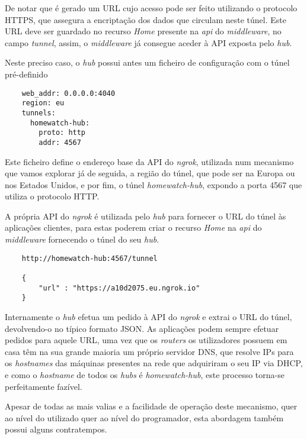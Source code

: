 De notar que é gerado um URL cujo acesso pode ser feito utilizando o protocolo HTTPS, que assegura a encriptação dos dados que circulam neste túnel. Este URL deve ser guardado no recurso \textit{Home} presente na \textit{api} do \textit{middleware}, no campo \textit{tunnel}, assim, o \textit{middleware} já consegue aceder à API exposta pelo \textit{hub}.

Neste preciso caso, o \textit{hub} possui antes um ficheiro de configuração com o túnel pré-definido

\begin{verbatim}
    web_addr: 0.0.0.0:4040
    region: eu
    tunnels:
      homewatch-hub:
        proto: http
        addr: 4567
\end{verbatim}

Este ficheiro define o endereço base da API do \textit{ngrok}, utilizada num mecanismo que vamos explorar já de seguida, a região do túnel, que pode ser na Europa ou nos Estados Unidos, e por fim, o túnel \textit{homewatch-hub}, expondo a porta 4567 que utiliza o protocolo HTTP.

A própria API do \textit{ngrok} é utilizada pelo \textit{hub} para fornecer o URL do túnel às aplicações clientes, para estas poderem criar o recurso \textit{Home} na \textit{api} do \textit{middleware} fornecendo o túnel do seu \textit{hub}.

\begin{verbatim}
    http://homewatch-hub:4567/tunnel

    {
        "url" : "https://a10d2075.eu.ngrok.io"
    }
\end{verbatim}

Internamente o \textit{hub} efetua um pedido à API do \textit{ngrok} e extrai o URL do túnel, devolvendo-o no típico formato JSON. As aplicações podem sempre efetuar pedidos para aquele URL, uma vez que os \textit{routers} os utilizadores possuem em casa têm na sua grande maioria um próprio servidor DNS, que resolve IPs para os \textit{hostnames} das máquinas presentes na rede que adquiriram o seu IP via DHCP, e como o \textit{hostname} de todos os \textit{hubs} é \textit{homewatch-hub}, este processo torna-se perfeitamente fazível.

Apesar de todas as mais valias e a facilidade de operação deste mecanismo, quer ao nível do utilizado quer ao nível do programador, esta abordagem também possui alguns contratempos.

